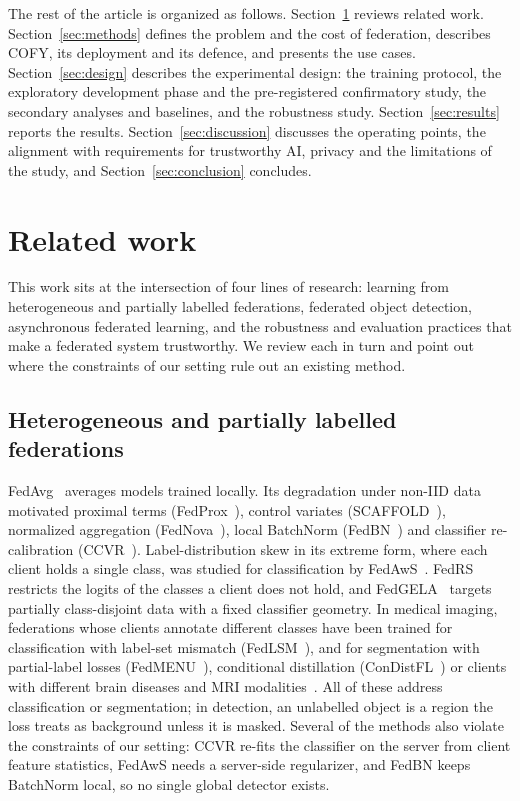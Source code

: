 \documentclass[pdflatex,sn-mathphys-num]{sn-jnl}
\newcommand{\sys}{COFY}
\begin{document}
The rest of the article is organized as follows. Section~\ref{sec:related} reviews related work. Section~\ref{sec:methods} defines the problem and the cost of federation, describes \sys{}, its deployment and its defence, and presents the use cases. Section~\ref{sec:design} describes the experimental design: the training protocol, the exploratory development phase and the pre-registered confirmatory study, the secondary analyses and baselines, and the robustness study. Section~\ref{sec:results} reports the results. Section~\ref{sec:discussion} discusses the operating points, the alignment with requirements for trustworthy AI, privacy and the limitations of the study, and Section~\ref{sec:conclusion} concludes.

\section{Related work}\label{sec:related}

This work sits at the intersection of four lines of research: learning from heterogeneous and partially labelled federations, federated object detection, asynchronous federated learning, and the robustness and evaluation practices that make a federated system trustworthy. We review each in turn and point out where the constraints of our setting rule out an existing method.

\subsection{Heterogeneous and partially labelled federations}
FedAvg~\cite{mcmahan2017fedavg} averages models trained locally. Its degradation under non-IID data motivated proximal terms (FedProx~\cite{li2020fedprox}), control variates (SCAFFOLD~\cite{karimireddy2020scaffold}), normalized aggregation (FedNova~\cite{wang2020fednova}), local BatchNorm (FedBN~\cite{li2021fedbn}) and classifier re-calibration (CCVR~\cite{luo2021ccvr}). Label-distribution skew in its extreme form, where each client holds a single class, was studied for classification by FedAwS~\cite{yu2020fedaws}. FedRS~\cite{li2021fedrs} restricts the logits of the classes a client does not hold, and FedGELA~\cite{fan2023fedgela} targets partially class-disjoint data with a fixed classifier geometry. In medical imaging, federations whose clients annotate different classes have been trained for classification with label-set mismatch (FedLSM~\cite{deng2023fedlsm}), and for segmentation with partial-label losses (FedMENU~\cite{xu2023fedmenu}), conditional distillation (ConDistFL~\cite{wang2024condistfl}) or clients with different brain diseases and MRI modalities~\cite{wagner2025feasibility}. All of these address classification or segmentation; in detection, an unlabelled object is a region the loss treats as background unless it is masked. Several of the methods also violate the constraints of our setting: CCVR re-fits the classifier on the server from client feature statistics, FedAwS needs a server-side regularizer, and FedBN keeps BatchNorm local, so no single global detector exists.
\end{document}
